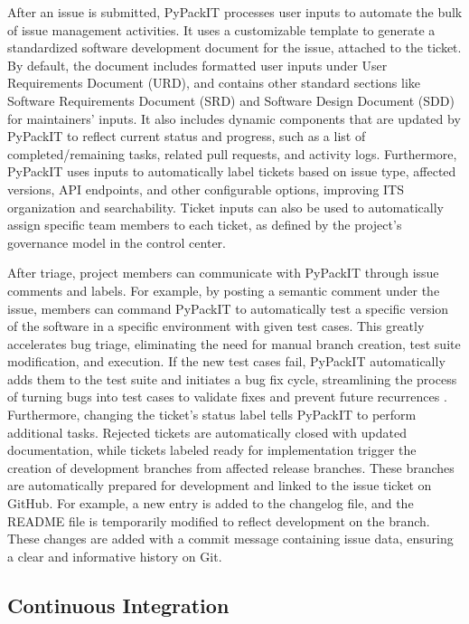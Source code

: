 \documentclass{article}
\begin{document}
After an issue is submitted, PyPackIT processes user inputs to automate the bulk of issue management activities. It uses a customizable template to generate a standardized software development document for the issue, attached to the ticket. By default, the document includes formatted user inputs under User Requirements Document (URD), and contains other standard sections like Software Requirements Document (SRD) and Software Design Document (SDD) for maintainers' inputs. It also includes dynamic components that are updated by PyPackIT to reflect current status and progress, such as a list of completed/remaining tasks, related pull requests, and activity logs. Furthermore, PyPackIT uses inputs to automatically label tickets based on issue type, affected versions, API endpoints, and other configurable options, improving ITS organization and searchability. Ticket inputs can also be used to automatically assign specific team members to each ticket, as defined by the project's governance model in the control center.

After triage, project members can communicate with PyPackIT through issue comments and labels. For example, by posting a semantic comment under the issue, members can command PyPackIT to automatically test a specific version of the software in a specific environment with given test cases. This greatly accelerates bug triage, eliminating the need for manual branch creation, test suite modification, and execution. If the new test cases fail, PyPackIT automatically adds them to the test suite and initiates a bug fix cycle, streamlining the process of turning bugs into test cases to validate fixes and prevent future recurrences \cite{BestPracticesForSciComp, 10SimpleRulesOnWritingCleanAndReliableSciSoft}. Furthermore, changing the ticket's status label tells PyPackIT to perform additional tasks. Rejected tickets are automatically closed with updated documentation, while tickets labeled ready for implementation trigger the creation of development branches from affected release branches. These branches are automatically prepared for development and linked to the issue ticket on GitHub. For example, a new entry is added to the changelog file, and the README file is temporarily modified to reflect development on the branch. These changes are added with a commit message containing issue data, ensuring a clear and informative history on Git.

\subsection{Continuous Integration} 
\label{overview-ci}
\end{document}
